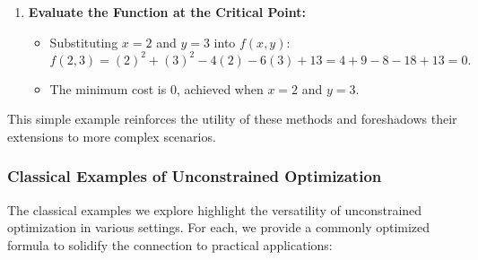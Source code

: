 \begin{example}
\begin{solution}
\begin{enumerate}
    \item \textbf{Evaluate the Function at the Critical Point:}
    \begin{itemize}
        \item Substituting \(x = 2\) and \(y = 3\) into \(f(x, y)\):
        \[
        f(2, 3) = (2)^2 + (3)^2 - 4(2) - 6(3) + 13 = 4 + 9 - 8 - 18 + 13 = 0.
        \]
        \item The minimum cost is \(0\), achieved when \(x = 2\) and \(y = 3\).
    \end{itemize}
\end{enumerate}
\end{solution}
\end{example}
\exampleline


\noindent This simple example reinforces the utility of these methods and foreshadows their extensions to more complex scenarios.

\subsubsection*{Classical Examples of Unconstrained Optimization}

\noindent The classical examples we explore highlight the versatility of unconstrained optimization in various settings. For each, we provide a commonly optimized formula to solidify the connection to practical applications:

